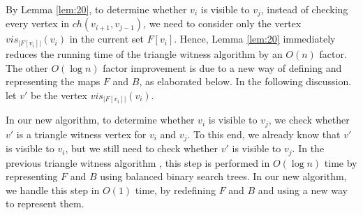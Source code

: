 \documentclass[11pt]{article}
\begin{document}
By Lemma \ref{lem:20}, to determine whether $v_i$ is visible to
$v_j$, instead of checking every vertex in $ch(v_{i+1},v_{j-1})$, we
need to consider only the vertex $vis_{|F[v_i]|}(v_i)$ in the current set $F[v_i]$. 
Hence, Lemma \ref{lem:20} immediately reduces the running time of the triangle
witness algorithm by an $O(n)$ factor. The other $O(\log n)$ factor
improvement is due to a new way of defining and representing the maps $F$ and
$B$, as elaborated below. In the following discussion.
let $v'$ be the vertex $vis_{|F[v_i]|}(v_i)$. 

In our new algorithm, to determine whether $v_i$ is visible
to $v_j$, we check whether $v'$ is a triangle witness vertex for $v_i$ and $v_j$.
To this end, we already
know that $v'$ is visible to $v_i$, but we still need to check whether $v'$
is visible to $v_j$. In the previous triangle witness algorithm
\cite{ref:DisserRe10}, this
step is performed in $O(\log n)$ time by representing $F$ and $B$ using
balanced binary search trees. In our new algorithm, we handle this
step in $O(1)$ time, by redefining $F$ and $B$ and using a new way to
represent them. 
\end{document}
